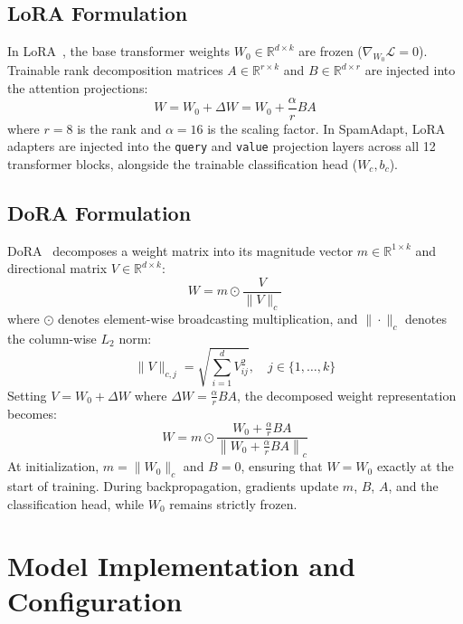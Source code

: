\documentclass[conference]{IEEEtran}
\begin{document}
\subsection{LoRA Formulation}
In LoRA~\cite{hu2022lora}, the base transformer weights $W_0 \in \mathbb{R}^{d \times k}$ are frozen ($\nabla_{W_0} \mathcal{L} = 0$). Trainable rank decomposition matrices $A \in \mathbb{R}^{r \times k}$ and $B \in \mathbb{R}^{d \times r}$ are injected into the attention projections:
\begin{equation}
W = W_0 + \Delta W = W_0 + \frac{\alpha}{r} B A
\end{equation}
where $r = 8$ is the rank and $\alpha = 16$ is the scaling factor. In SpamAdapt, LoRA adapters are injected into the \texttt{query} and \texttt{value} projection layers across all 12 transformer blocks, alongside the trainable classification head ($W_c, b_c$).

\subsection{DoRA Formulation}
DoRA~\cite{liu2024dora} decomposes a weight matrix into its magnitude vector $m \in \mathbb{R}^{1 \times k}$ and directional matrix $V \in \mathbb{R}^{d \times k}$:
\begin{equation}
W = m \odot \frac{V}{\|V\|_c}
\end{equation}
where $\odot$ denotes element-wise broadcasting multiplication, and $\|\cdot\|_c$ denotes the column-wise $L_2$ norm:
\begin{equation}
\|V\|_{c, j} = \sqrt{\sum_{i=1}^d V_{ij}^2}, \quad j \in \{1, \dots, k\}
\end{equation}
Setting $V = W_0 + \Delta W$ where $\Delta W = \frac{\alpha}{r} B A$, the decomposed weight representation becomes:
\begin{equation}
W = m \odot \frac{W_0 + \frac{\alpha}{r} B A}{\left\| W_0 + \frac{\alpha}{r} B A \right\|_c}
\end{equation}
At initialization, $m = \|W_0\|_c$ and $B = 0$, ensuring that $W = W_0$ exactly at the start of training. During backpropagation, gradients update $m$, $B$, $A$, and the classification head, while $W_0$ remains strictly frozen.

\section{Model Implementation and Configuration}
\label{sec:model_config}
\end{document}
